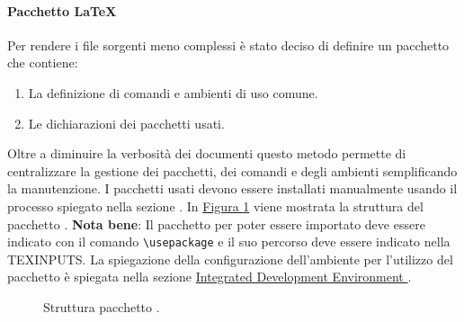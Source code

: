 \paragraph{Pacchetto LaTeX}
Per rendere i file sorgenti meno complessi è stato deciso di definire un pacchetto  che contiene:
\begin{enumerate}
    \item La definizione di comandi e ambienti di uso comune.
    \item Le dichiarazioni dei pacchetti usati.
\end{enumerate}
Oltre a diminuire la verbosità dei documenti questo metodo permette di centralizzare la gestione dei pacchetti, dei comandi e degli ambienti semplificando la manutenzione.
I pacchetti usati devono essere installati manualmente usando il processo spiegato nella sezione \hyperref[subpar:TLShell]{}.
In \hyperref[fig:pacchetto_latex]{Figura \ref{fig:pacchetto_latex}} viene mostrata la struttura del pacchetto .
\textbf{Nota bene}: Il pacchetto per poter essere importato deve essere indicato con il comando \lstinline|\usepackage| e il suo percorso deve essere indicato nella  TEXINPUTS.
La spiegazione della configurazione dell'ambiente per l'utilizzo del pacchetto è spiegata nella sezione \hyperref[par:IDE]{Integrated Development Environment }.
\begin{figure}[H]
    \caption{Struttura pacchetto .}
    \label{fig:pacchetto_latex}
\end{figure}

